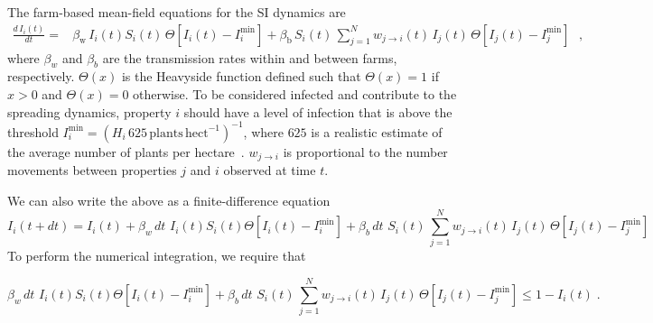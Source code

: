 \documentclass[a4paper,aps,superscriptaddress,floatfix,nofootinbib,longbibliography, onecolumn]{revtex4-1}
\begin{document}
The farm-based mean-field equations for the SI dynamics are
\begin{equation}
\begin{array}{ll}
\frac{d \, I_i(t)}{dt} = & \beta_{\mathrm{w}} \, I_i(t) S_{i}(t) \, \Theta \left[I_i(t) - I_i^{\min} \right] +
\beta_{\mathrm{b}} \, S_{i}(t) \,  \sum_{j=1}^N w_{j \to i}(t)  \, I_{j}(t) \, \Theta \left[I_j(t) - I_j^{\min} \right] 
\end{array}
\; ,
\label{eq:cont}
\end{equation}
where $\beta_{w}$ and $\beta_{b}$ are the transmission rates within and between farms, respectively.  $\Theta(x)$ is the Heavyside function defined such that $\Theta(x) = 1$ if $x > 0$ and 
$\Theta(x) = 0$ otherwise. To be considered infected and contribute to the spreading dynamics, property $i$ should have a level of infection that is above the threshold  $I_{i}^{\min} = \left(H_i \, 625 \, \mathrm{plants \, hect}^{-1}\right)^{-1}$, where $625$ is a realistic estimate of the average number of plants per hectare~\cite{NZKGI2024}. 
$w_{j \to i}$ is proportional to the number movements between properties $j$ and $i$ observed at time $t$.

We can also write the above as a finite-difference equation
\begin{equation}
I_{i}(t+dt) = I_{i}(t) + \beta_{w} \, dt \, \, I_i(t)  S_{i}(t)\Theta \left[I_i(t) - I_i^{\min} \right] + \beta_{b} \, dt \, \, S_{i}(t) \,  \sum_{j=1}^N w_{j \to i}(t)  \, I_{j}(t) \, \Theta \left[I_j(t) - I_j^{\min} \right] 
\label{eq:fd}
\end{equation}
To perform the numerical integration, we require that  

\begin{equation}
    \beta_{w} \, dt \, \, I_i(t)  S_{i}(t)\Theta \left[I_i(t) - I_i^{\min} \right]  +  \beta_{b} \, dt \, \, S_{i}(t) \,  \sum_{j=1}^N w_{j \to i}(t)  \, I_{j}(t) \, \Theta \left[I_j(t) - I_j^{\min} \right]  \leq 1 - I_i(t)\; .
\end{equation}
\end{document}
